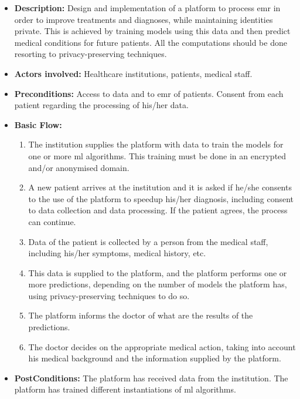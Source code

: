 \begin{itemize}
	\setlength\itemsep{1em}

	\item \textbf{Description:} Design and implementation of a platform to process \ac{emr} in order to improve treatments and diagnoses, while maintaining identities private. This is achieved by training models using this data and then predict medical conditions for future patients. All the computations should be done resorting to privacy-preserving techniques.

	\item \textbf{Actors involved:} Healthcare institutions, patients, medical staff.

	\item \textbf{Preconditions:} Access to data and to \ac{emr} of patients. Consent from each patient regarding the processing of his/her data.

	\item \textbf{Basic Flow:} 
	
	\begin{enumerate}
		\item The institution supplies the platform with data to train the models for one or more \ac{ml} algorithms. This training must be done in an encrypted and/or anonymised domain.

		\item A new patient arrives at the institution and it is asked if he/she consents to the use of the platform to speedup his/her diagnosis, including consent to data collection and data processing. If the patient agrees, the process can continue.

		\item Data of the patient is collected by a person from the medical staff, including his/her symptoms, medical history, etc.

		\item This data is supplied to the platform, and the platform performs one or more predictions, depending on the number of models the platform has, using privacy-preserving techniques to do so.

		\item The platform informs the doctor of what are the results of the predictions.

		\item The doctor decides on the appropriate medical action, taking into account his medical background and the information supplied by the platform.


	\end{enumerate}

	\item \textbf{PostConditions:} The platform has received data from the institution. The platform has trained different instantiations of \ac{ml} algorithms.

\end{itemize}






